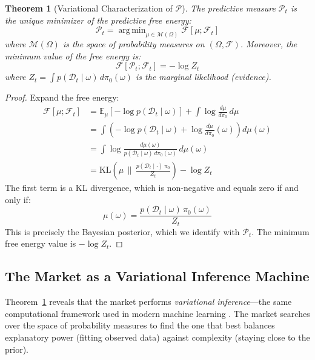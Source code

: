 \documentclass[12pt,a4paper]{article}
\newtheorem{theorem}{Theorem}[section]
\theoremstyle{definition}
\newcommand{\E}{\mathbb{E}}
\newcommand{\F}{\mathcal{F}}
\newcommand{\M}{\mathcal{M}}
\newcommand{\PP}{\mathcal{P}}
\newcommand{\KL}{\mathrm{KL}}
\DeclareMathOperator*{\argmin}{arg\,min}
\begin{document}
\begin{theorem}[Variational Characterization of $\PP$]\label{thm:variational}
The predictive measure $\PP_t$ is the unique minimizer of the predictive free energy:
\begin{equation}\label{eq:variational_opt}
    \PP_t = \argmin_{\mu \in \M(\Omega)} \mathcal{F}[\mu; \F_t]
\end{equation}
where $\M(\Omega)$ is the space of probability measures on $(\Omega, \F)$. Moreover, the minimum value of the free energy is:
\begin{equation}\label{eq:min_free_energy}
    \mathcal{F}[\PP_t; \F_t] = -\log Z_t
\end{equation}
where $Z_t = \int p(\mathcal{D}_t \mid \omega) \, d\pi_0(\omega)$ is the marginal likelihood (evidence).
\end{theorem}

\begin{proof}
Expand the free energy:
\begin{align}
    \mathcal{F}[\mu; \F_t] &= \E_\mu[-\log p(\mathcal{D}_t \mid \omega)] + \int \log \frac{d\mu}{d\pi_0} \, d\mu \\
    &= \int \left(-\log p(\mathcal{D}_t \mid \omega) + \log \frac{d\mu}{d\pi_0}(\omega)\right) d\mu(\omega) \\
    &= \int \log \frac{d\mu(\omega)}{p(\mathcal{D}_t \mid \omega) \, d\pi_0(\omega)} \, d\mu(\omega) \\
    &= \KL\left(\mu \,\Big\|\, \frac{p(\mathcal{D}_t \mid \cdot) \, \pi_0}{Z_t}\right) - \log Z_t
\end{align}
The first term is a KL divergence, which is non-negative and equals zero if and only if:
\begin{equation}
    \mu(\omega) = \frac{p(\mathcal{D}_t \mid \omega) \, \pi_0(\omega)}{Z_t}
\end{equation}
This is precisely the Bayesian posterior, which we identify with $\PP_t$. The minimum free energy value is $-\log Z_t$.
\end{proof}

\subsection{The Market as a Variational Inference Machine}

Theorem~\ref{thm:variational} reveals that the market performs \emph{variational inference}---the same computational framework used in modern machine learning \citep{blei2017}. The market searches over the space of probability measures to find the one that best balances explanatory power (fitting observed data) against complexity (staying close to the prior).
\end{document}
